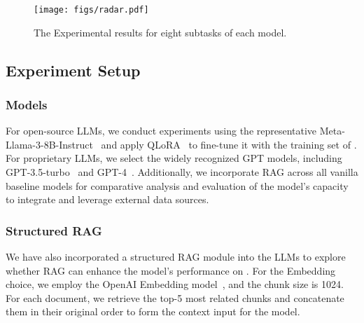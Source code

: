 \begin{figure*}[t!]
\begin{center}
\texttt{[image: figs/radar.pdf]}
\end{center}
  \caption{The Experimental results for eight subtasks of each model.}
  \label{fig:acc}
\end{figure*}

\subsection{Experiment Setup}
\subsubsection{Models}
For open-source LLMs, we conduct experiments using the representative Meta-Llama-3-8B-Instruct~\citep{Llama3_2024} and  apply QLoRA~\citep{dettmers2023qlora} to fine-tune it with the training set of \ben. For proprietary LLMs, we select the widely recognized GPT models, including GPT-3.5-turbo~\citep{ouyang2022training} and GPT-4~\citep{achiam2023gpt}. Additionally, we incorporate RAG across all vanilla baseline models for comparative analysis and evaluation of the model's capacity to integrate and leverage external data sources.

\subsubsection{Structured RAG}
We have also incorporated a structured RAG module into the LLMs to explore whether RAG can enhance the model’s performance on \ben. For the Embedding choice, we employ the OpenAI Embedding model~\citep{TextEmbeddingAda002}, and the chunk size is 1024. For each document, we retrieve the top-5 most related chunks and concatenate them in their original order to form the context input for the model.
 
